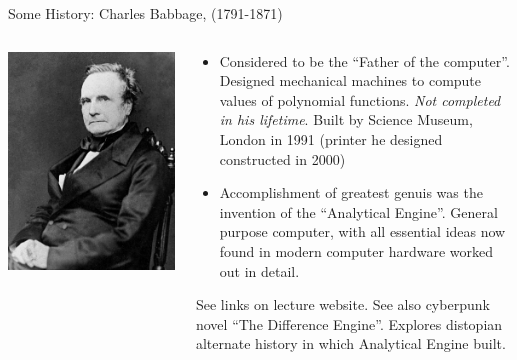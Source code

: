 \documentclass[aspectratio=169]{beamer}
\newcommand{\mypause}{}
\newcommand{\cramplist}{
	\setlength{\itemsep}{0in}
	\setlength{\partopsep}{0in}
	\setlength{\topsep}{0in}}
\begin{document}
\begin{frame}{Some History: Charles Babbage, (1791-1871)}
  \begin{columns}
    
    \begin{column}{0.4\linewidth}
      \includegraphics[width=\linewidth]{Charles_Babbage-1860.jpg}
    \end{column}

    \begin{column}{0.6\linewidth}
      \begin{itemize}\cramplist
      \item Considered to be the ``Father of the computer''. Designed
        mechanical machines to compute values of polynomial
        functions. \emph{Not completed in his lifetime}. Built by
        Science Museum, London in 1991 (printer he designed
        constructed in 2000)
        \mypause%
      \item Accomplishment of greatest genuis was the invention of the
        ``Analytical Engine''. General purpose computer, with all
        essential ideas now found in modern computer hardware worked
        out in detail.
      \end{itemize}
      See links on lecture website. See also cyberpunk novel ``The
      Difference Engine''. Explores distopian alternate history in
      which Analytical Engine built.
    \end{column}
  \end{columns}
\end{frame}
\end{document}
